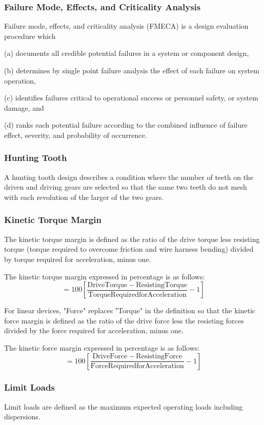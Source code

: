 \documentclass[12pt]{article}
\begin{document}
\subsubsection{Failure Mode, Effects, and Criticality Analysis}
Failure mode, effects, and criticality analysis (FMECA) is a design evaluation procedure which 

(a) documents all credible potential failures in a system or component design, 

(b) determines by single point failure analysis the effect of each failure on system operation, 

(c) identifies failures critical to operational success or personnel safety, or system damage, and 

(d) ranks each potential failure according to the combined influence of failure effect, severity, and probability of occurrence.

\subsubsection{Hunting Tooth}
A hunting tooth design describes a condition where the number of teeth on the driven and driving gears are selected so that the same two teeth do not mesh with each revolution of the larger of the two gears. 

\subsubsection{Kinetic Torque Margin}
The kinetic torque margin is defined as the ratio of the drive torque less resisting torque (torque required to overcome friction and wire harness bending) divided by torque required for acceleration, minus one.

The kinetic torque margin expressed in percentage is as follows:
$$ = 100 \left[ \frac{\mathrm{Drive Torque - Resisting Torque}}{\mathrm{Torque Required for Acceleration}} - 1\right] $$

For linear devices, "Force" replaces "Torque" in the definition so that the kinetic force margin is defined as the ratio of the drive force less the resisting forces divided by the force required for acceleration, minus one.

The kinetic force margin expressed in percentage is as follows:
$$ = 100 \left[ \frac{\mathrm{Drive Force - Resisting Force}}{\mathrm{Force Required for Acceleration}} - 1\right] $$

\subsubsection{Limit Loads}
Limit loads are defined as the maximum expected operating loads including dispersions.
\end{document}
